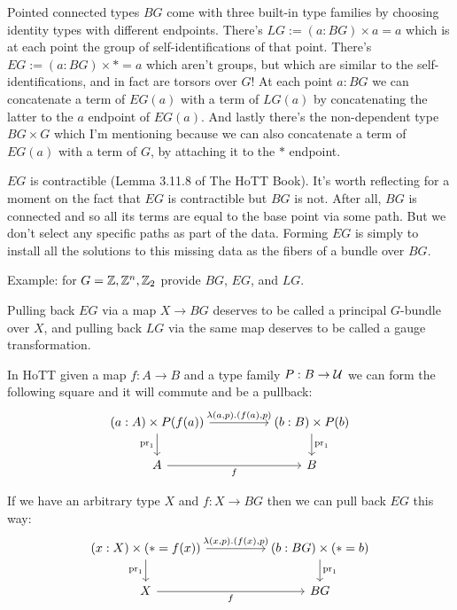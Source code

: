 \documentclass[12pt]{report}
\begin{document}


Pointed connected types $BG$ come with three built-in type families by choosing identity types with different endpoints. There's $LG:=(a:BG)\times a=a$ which is at each point the group of self-identifications of that point. There's $EG:=(a:BG)\times *=a$ which aren't groups, but which are similar to the self-identifications, and in fact are torsors over $G$! At each point $a:BG$ we can concatenate a term of $EG(a)$ with a term of $LG(a)$ by concatenating the latter to the $a$ endpoint of $EG(a)$. And lastly there's the non-dependent type $BG\times G$ which I'm mentioning because we can also concatenate a term of $EG(a)$ with a term of $G$, by attaching it to the $*$ endpoint.

$EG$ is contractible (Lemma 3.11.8 of The HoTT Book\cite{hottbook}). It's worth reflecting for a moment on the fact that $EG$ is contractible but $BG$ is not. After all, $BG$ is connected and so all its terms are equal to the base point via some path. But we don't select any specific paths as part of the data. Forming $EG$ is simply to install all the solutions to this missing data as the fibers of a bundle over $BG$.

Example: for $G=\mathbb{Z}, \mathbb{Z}^n, \mathbb{Z}_2 $ provide $BG$, $EG$, and $LG$.

Pulling back $EG$ via a map $X\to BG$ deserves to be called a principal $G$-bundle over $X$, and pulling back $LG$ via the same map deserves to be called a gauge transformation.

In HoTT given a map $f:A\to B$ and a type family $P:B\to \mathcal{U}$ we can form the following square and it will commute and be a pullback:
\[\begin{tikzcd}
	{(a:A)\times P(f(a))} && {(b:B)\times P(b)} \\
	A && B
	\arrow["{\mathrm{pr}_1}", from=1-3, to=2-3]
	\arrow["{\lambda(a, p).(f(a),p)}", from=1-1, to=1-3]
	\arrow["f"', from=2-1, to=2-3]
	\arrow["{\mathrm{pr}_1}"', from=1-1, to=2-1]
\end{tikzcd}\]

If we have an arbitrary type $X$ and $f:X\to BG$ then we can pull back $EG$ this way:
\[\begin{tikzcd}
	{(x:X)\times (*=f(x))} && {(b:BG)\times (*=b)} \\
	X && BG
	\arrow["{\mathrm{pr}_1}", from=1-3, to=2-3]
	\arrow["{\lambda(x, p).(f(x),p)}", from=1-1, to=1-3]
	\arrow["f"', from=2-1, to=2-3]
	\arrow["{\mathrm{pr}_1}"', from=1-1, to=2-1]
\end{tikzcd}\]
\end{document}

